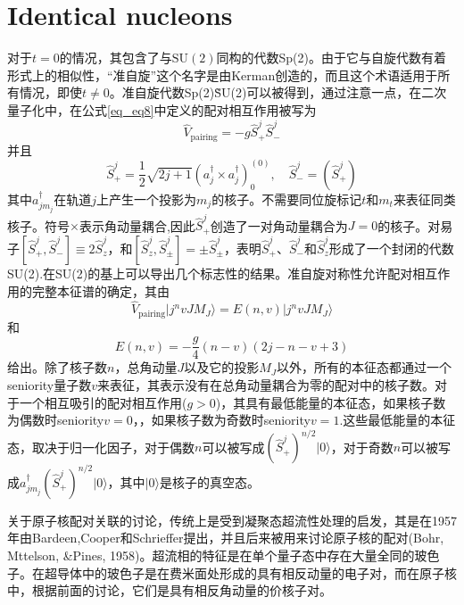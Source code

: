 \section{Identical nucleons}
对于$t=0$的情况，其包含了与$\textrm{SU}(2)$同构的代数Sp(2)。由于它与自旋代数有着形式上的相似性，“准自旋”这个名字是由Kerman创造的，而且这个术语适用于所有情况，即使$t\ne0$。准自旋代数Sp(2)\~SU(2)可以被得到，通过注意一点，在二次量子化中，在公式\ref{eq_eq8}中定义的配对相互作用被写为
\begin{equation}\label{eq_Vpair}
\widehat{V}_\textrm{pairing}=-g\widehat{S}^j_+\widehat{S}^j_-
\end{equation}
并且
\begin{equation}
\widehat{S}^j_+=\frac{1}{2}\sqrt{2j+1}(a_j^\dag\times a_j^\dag)^{(0)}_0,\quad\widehat{S}^j_-=\left(\widehat{S}^j_+\right)
\end{equation}
其中$a_{jm_j}^\dagger$在轨道$j$上产生一个投影为$m_j$的核子。不需要同位旋标记$t$和$m_t$来表征同类核子。符号$\times$表示角动量耦合,因此$\widehat{S}^j_+$创造了一对角动量耦合为$J=0$的核子。对易子$[\widehat{S}^j_+,\widehat{S}^j_-]\equiv2\widehat{S}^j_z$，和$[\widehat{S}^j_z,\widehat{S}^j_\pm]=\pm\widehat{S}^j_\pm$，表明$\widehat{S}^j_+$、$\widehat{S}^j_-$和$\widehat{S}^j_z$形成了一个封闭的代数SU(2).在SU(2)的基上可以导出几个标志性的结果。准自旋对称性允许配对相互作用的完整本征谱的确定，其由
\begin{equation}
\widehat{V}_\textrm{pairing}|j^nvJM_J\rangle=E(n,v)|j^nvJM_J\rangle
\end{equation}
和
\begin{equation}\label{eq_13}
E(n,v)=-\frac{g}{4}(n-v)(2j-n-v+3)
\end{equation}
给出。除了核子数$n$，总角动量$J$以及它的投影$M_J$以外，所有的本征态都通过一个seniority量子数$v$来表征，其表示没有在总角动量耦合为零的配对中的核子数。对于一个相互吸引的配对相互作用($g>0$)，其具有最低能量的本征态，如果核子数为偶数时seniority$v=0$，，如果核子数为奇数时seniority$v=1$.这些最低能量的本征态，取决于归一化因子，对于偶数$n$可以被写成$(\widehat{S}^j_+)^{n/2}|0\rangle$，对于奇数$n$可以被写成$a_{jm_j}^\dag(\widehat{S}^j_+)^{n/2}|0\rangle$，其中$|0\rangle$是核子的真空态。

关于原子核配对关联的讨论，传统上是受到凝聚态超流性处理的启发，其是在1957年由Bardeen,Cooper和Schrieffer提出，并且后来被用来讨论原子核的配对(Bohr, Mttelson, \&Pines, 1958)。超流相的特征是在单个量子态中存在大量全同的玻色子。在超导体中的玻色子是在费米面处形成的具有相反动量的电子对，而在原子核中，根据前面的讨论，它们是具有相反角动量的价核子对。

